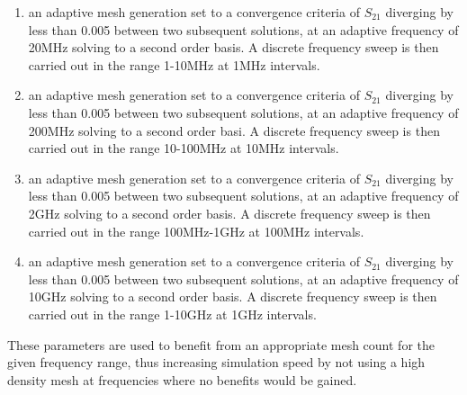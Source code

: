 \begin{enumerate}
\item{an adaptive mesh generation set to a convergence criteria of $S_{21}$ diverging by less than 0.005 between two subsequent solutions, at an adaptive frequency of 20MHz solving to a second order basis. A discrete frequency sweep is then carried out in the range 1-10MHz at 1MHz intervals.}
\item{an adaptive mesh generation set to a convergence criteria of $S_{21}$ diverging by less than 0.005 between two subsequent solutions, at an adaptive frequency of 200MHz solving to a second order basi. A discrete frequency sweep is then carried out in the range 10-100MHz at 10MHz intervals.}
\item{an adaptive mesh generation set to a convergence criteria of $S_{21}$ diverging by less than 0.005 between two subsequent solutions, at an adaptive frequency of 2GHz solving to a second order basis. A discrete frequency sweep is then carried out in the range 100MHz-1GHz at 100MHz intervals.}
\item{an adaptive mesh generation set to a convergence criteria of $S_{21}$ diverging by less than 0.005 between two subsequent solutions, at an adaptive frequency of 10GHz solving to a second order basis. A discrete frequency sweep is then carried out in the range 1-10GHz at 1GHz intervals.}
\end{enumerate}

These parameters are used to benefit from an appropriate mesh count for the given frequency range, thus increasing simulation speed by not using a high density mesh at frequencies where no benefits would be gained.

